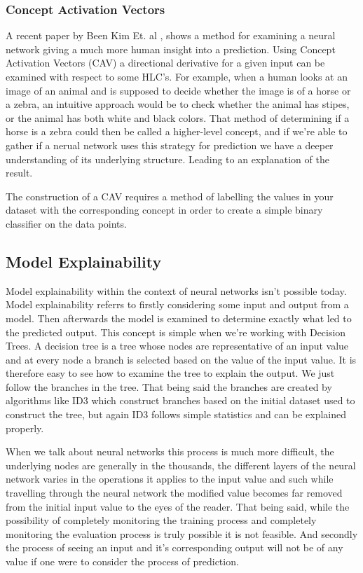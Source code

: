 \subsubsection{Concept Activation Vectors}

A recent paper by Been Kim Et. al \cite{Keem:TCAV}, shows a method for examining
a neural network giving a much more human insight into a prediction. Using Concept
Activation Vectors (CAV) a directional derivative for a given input can be examined
with respect to some HLC's. For example, when a human looks at an image of an animal
and is supposed to decide whether the image is of a horse or a zebra, an intuitive
approach would be to check whether the animal has stipes, or the animal has both white and black colors.
That method of determining if a horse is a zebra could then be called a higher-level
concept, and if we're able to gather if a nerual network uses this strategy for prediction
we have a deeper understanding of its underlying structure. Leading to an explanation of
the result.

The construction of a CAV requires a method of labelling the values in your dataset with
the corresponding concept in order to create a simple binary classifier on the data points.

\subsection{Model Explainability}

Model explainability within the context of neural networks isn't possible today. Model
explainability referrs to firstly considering some input and output from a model. Then
afterwards the model is examined to determine exactly what led to the predicted output.
This concept is simple when we're working with Decision Trees. A decision tree is a tree
whose nodes are representative of an input value and at every node a branch is selected
based on the value of the input value. It is therefore easy to see how to examine the tree
to explain the output. We just follow the branches in the tree. That being said the branches
are created by algorithms like ID3 which construct branches based on the initial dataset used
to construct the tree, but again ID3 follows simple statistics and can be explained properly.


When we talk about neural networks this process is much more difficult, the underlying nodes
are generally in the thousands, the different layers of the neural network varies in the operations
it applies to the input value and such while travelling through the neural network the modified
value becomes far removed from the initial input value to the eyes of the reader. That being said,
while the possibility of completely monitoring the training process and completely monitoring the
evaluation process is truly possible it is not feasible. And secondly the process of seeing an
input and it's corresponding output will not be of any value if one were to consider the process
of prediction.

